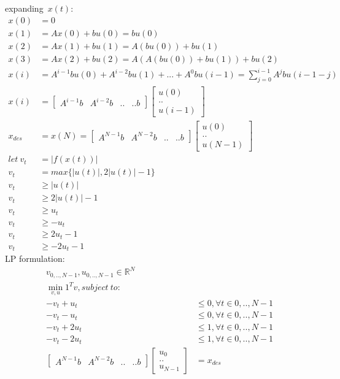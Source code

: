 \documentclass[12pt,letter]{article}
\newcommand{\R}{\mathbb{R}}
\begin{document}
\begin{enumerate}
  expanding\ $x(t)$:\\
  \begin{align*}
    x(0)&=0\\
    x(1)&=Ax(0)+bu(0) = bu(0)\\
    x(2)&=Ax(1)+bu(1)=A(bu(0))+bu(1)\\
    x(3)&=Ax(2)+bu(2)=A(A(bu(0))+bu(1))+bu(2)\\
    x(i)&=A^{i-1}bu(0) + A^{i-2}bu(1) + ... + A^0 bu(i-1)=\sum_{j=0}^{i-1} A^{j}bu(i-1-j)\\
    x(i)&=
    \begin{bmatrix}
      A^{i-1}b & A^{i-2}b & .. & .. b
    \end{bmatrix}
    \begin{bmatrix}
      u(0) \\ .. \\ u(i-1)
    \end{bmatrix}\\
    x_{des} & = x(N) = \begin{bmatrix}
      A^{N-1}b & A^{N-2}b & .. & .. b
    \end{bmatrix}
    \begin{bmatrix}
      u(0) \\ .. \\ u(N-1)
    \end{bmatrix}\\
    let\ v_t & = |f(x(t))|\\
    v_t & = max\{ |u(t)|, 2|u(t)|-1 \}\\
    v_t &\geq |u(t)|\\
    v_t &\geq 2|u(t)|-1\\
    v_t &\geq u_t\\
    v_t &\geq -u_t\\
    v_t &\geq 2u_t-1\\
    v_t &\geq -2u_t-1
  \end{align*}
  LP formulation:
  \begin{align*}
    v_{0,..,N-1},u_{0,..,N-1} \in \R^N\\
    \min_{v,u} 1^T v, subject\ to:\\
    -v_t + u_t & \leq 0, \forall t \in {0,..,N-1}\\
    - v_t -u_t & \leq 0, \forall t \in {0,..,N-1}\\
    -v_t + 2u_t & \leq 1, \forall t \in {0,..,N-1}\\
    -v_t - 2u_t & \leq 1, \forall t \in {0,..,N-1}\\
    \begin{bmatrix}
      A^{N-1}b & A^{N-2}b & .. & .. b
    \end{bmatrix}
    \begin{bmatrix}
      u_{0} \\ .. \\ u_{N-1}
    \end{bmatrix} & = x_{des}\\
  \end{align*}
  

\end{enumerate}
\end{document}
